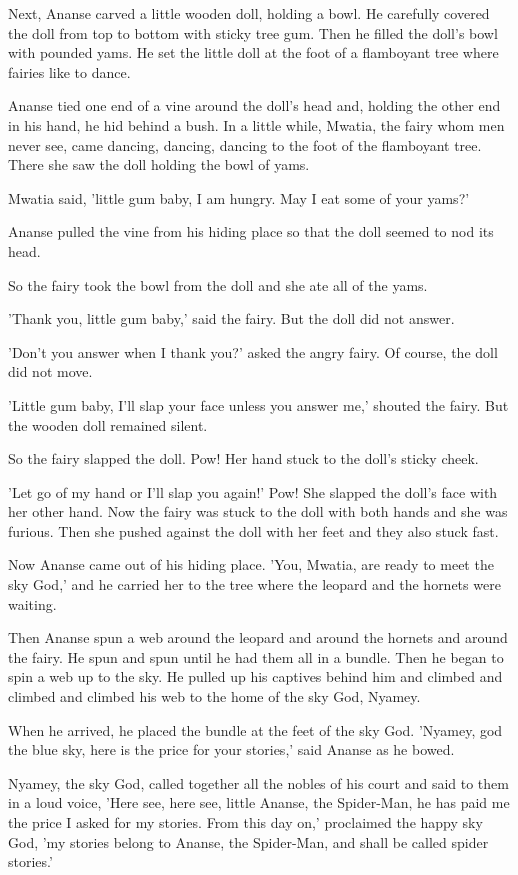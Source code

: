 Next, Ananse carved a little wooden doll, holding a bowl. He carefully covered the doll from top to bottom with sticky tree gum. Then he filled the doll's bowl with pounded yams. He set the little doll at the foot of a flamboyant tree where fairies like to dance.

Ananse tied one end of a vine around the doll's head and, holding the other end in his hand, he hid behind a bush. In a little while, Mwatia, the fairy whom men never see, came dancing, dancing, dancing to the foot of the flamboyant tree. There she saw the doll holding the bowl of yams.

Mwatia said, 'little gum baby, I am hungry. May I eat some of your yams?'

Ananse pulled the vine from his hiding place so that the doll seemed to nod its head.

So the fairy took the bowl from the doll and she ate all of the yams.

'Thank you, little gum baby,' said the fairy. But the doll did not answer.

'Don't you answer when I thank you?' asked the angry fairy. Of course, the doll did not move.

'Little gum baby, I'll slap your face unless you answer me,' shouted the fairy. But the wooden doll remained silent.

So the fairy slapped the doll. Pow! Her hand stuck to the doll's sticky cheek.

'Let go of my hand or I'll slap you again!' Pow! She slapped the doll's face with her other hand. Now the fairy was stuck to the doll with both hands and she was furious. Then she pushed against the doll with her feet and they also stuck fast.

Now Ananse came out of his hiding place. 'You, Mwatia, are ready to meet the sky God,' and he carried her to the tree where the leopard and the hornets were waiting.

Then Ananse spun a web around the leopard and around the hornets and around the fairy. He spun and spun until he had them all in a bundle. Then he began to spin a web up to the sky. He pulled up his captives behind him and climbed and climbed and climbed his web to the home of the sky God, Nyamey.

When he arrived, he placed the bundle at the feet of the sky God. 'Nyamey, god the blue sky, here is the price for your stories,' said Ananse as he bowed.

Nyamey, the sky God, called together all the nobles of his court and said to them in a loud voice, 'Here see, here see, little Ananse, the Spider-Man, he has paid me the price I asked for my stories. From this day on,' proclaimed the happy sky God, 'my stories belong to Ananse, the Spider-Man, and shall be called spider stories.'

